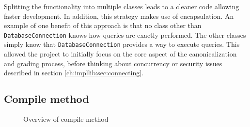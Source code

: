 Splitting the functionality into multiple classes leads to a cleaner code allowing faster development. In addition, this strategy makes use of encapsulation. An example of one benefit of this approach is that no class other than \texttt{DatabaseConnection} knows how queries are exactly performed. The other classes simply know that \texttt{DatabaseConnection} provides a way to execute queries. This allowed the project to initially focus on the core aspect of the canonicalization and grading process, before thinking about concurrency or security issues described in section \ref{ch:impllib:sec:connecting}.

\subsection{Compile method}
\begin{figure}[H]
\caption{Overview of compile method}
\end{figure}

